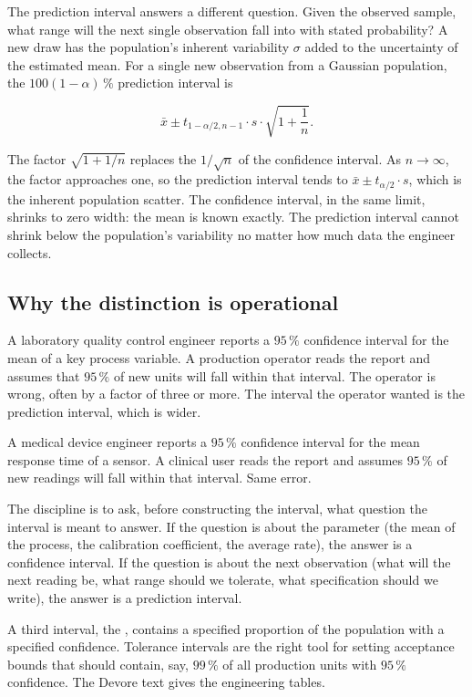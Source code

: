 The prediction interval answers a different question. Given the
observed sample, what range will the next single observation fall
into with stated probability? A new draw has the population's
inherent variability $\sigma$ added to the uncertainty of the
estimated mean. For a single new observation from a Gaussian
population, the $100(1 - \alpha) \,\%$ prediction interval is

\[
\bar{x} \pm t_{1-\alpha/2, n-1} \cdot s \cdot \sqrt{1 + \frac{1}{n}}.
\]

The factor $\sqrt{1 + 1/n}$ replaces the $1/\sqrt{n}$ of the
confidence interval. As $n \to \infty$, the factor approaches one,
so the prediction interval tends to $\bar{x} \pm t_{\alpha/2} \cdot
s$, which is the inherent population scatter. The confidence
interval, in the same limit, shrinks to zero width: the mean is
known exactly. The prediction interval cannot shrink below the
population's variability no matter how much data the engineer
collects.

\subsection{Why the distinction is operational}

A laboratory quality control engineer reports a $95 \,\%$ confidence
interval for the mean of a key process variable. A production
operator reads the report and assumes that $95 \,\%$ of new units
will fall within that interval. The operator is wrong, often by a
factor of three or more. The interval the operator wanted is the
prediction interval, which is wider.

A medical device engineer reports a $95 \,\%$ confidence interval
for the mean response time of a sensor. A clinical user reads the
report and assumes $95 \,\%$ of new readings will fall within that
interval. Same error.

The discipline is to ask, before constructing the interval, what
question the interval is meant to answer. If the question is about
the parameter (the mean of the process, the calibration coefficient,
the average rate), the answer is a confidence interval. If the
question is about the next observation (what will the next reading
be, what range should we tolerate, what specification should we
write), the answer is a prediction interval.

A third interval, the , contains a
specified proportion of the population with a specified confidence.
Tolerance intervals are the right tool for setting acceptance bounds
that should contain, say, $99 \,\%$ of all production units with
$95 \,\%$ confidence. The Devore text \cite[ch.~7]{text:devore2015}
gives the engineering tables.

